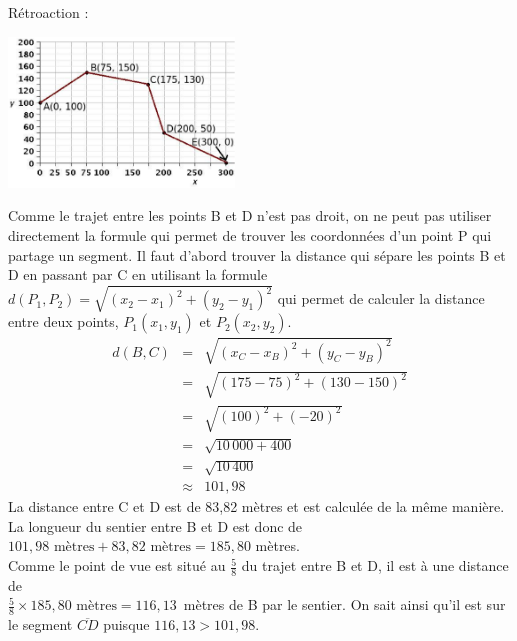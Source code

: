 \documentclass[letterpaper, 12pt]{article}
\begin{document}
R\'etroaction :\\
\begin{center}
 \includegraphics[width=6cm,bb=14 14 531 362]{Q2468.eps}
\end{center}
Comme le trajet entre les points B et D n'est pas droit, on ne peut pas utiliser directement la formule qui permet de trouver les coordonn\'ees d'un point P qui partage un segment. Il faut d'abord trouver la distance qui s\'epare les points B et D en passant par C en utilisant la formule\\
 \mbox{$d(P_{1}, P_{2})=\sqrt{(x_{2}-x_{1})^{2}+(y_{2}-y_{1})^{2}}$} qui permet de calculer la distance entre deux points, $P_{1}(x_{1}, y_{1})$ et  $P_{2}(x_{2}, y_{2})$.
\begin{eqnarray*}
 d(B, C)&=&\sqrt{(x_{C}-x_{B})^{2}+(y_{C}-y_{B})^{2}}\\
&=&\sqrt{(175-75)^{2}+(130-150)^{2}}\\
&=&\sqrt{(100)^{2}+(-20)^{2}}\\
&=&\sqrt{10\,000+400}\\
&=&\sqrt{10\,400}\\
&\approx&101,98
\end{eqnarray*}
La distance entre C et D est de 83,82 m\`etres et est calcul\'ee de la m\^eme mani\`ere. La longueur du sentier entre B et D est donc de $101,98\textrm{ m\`etres}+83,82\textrm{ m\`etres}=185,80$ m\`etres.\\
Comme le point de vue est situ\'e au $\frac{5}{8}$ du trajet entre B et D, il est \`a une distance de\\
 \mbox{$\frac{5}{8}\times 185,80\textrm{ m\`etres}=116,13$ m\`etres} de B par le sentier. On sait ainsi qu'il est sur le segment $\overline{CD}$ puisque $116,13>101,98$.\\
\end{document}
